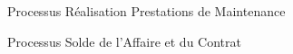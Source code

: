 \begin{figure}[H]
    \label{fig-real-prest}
    \noindent{}
    \caption{Processus Réalisation Prestations de Maintenance}
\end{figure}

\begin{figure}[H]
    \label{fig-solde-affaire}
    \noindent{}
    \caption{Processus Solde de l'Affaire et du Contrat}
\end{figure}



